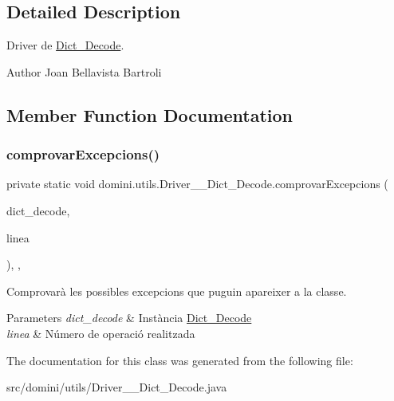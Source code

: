 \subsection{Detailed Description}
Driver de \hyperlink{classdomini_1_1utils_1_1Dict__Decode}{Dict\+\_\+\+Decode}. 

\begin{DoxyAuthor}{Author}
Joan Bellavista Bartroli 
\end{DoxyAuthor}


\subsection{Member Function Documentation}
\mbox{\label{classdomini_1_1utils_1_1Driver____Dict__Decode_a41ddfd0f1473de9401aa7860cff2f3e8}} 
\subsubsection{\texorpdfstring{comprovar\+Excepcions()}{comprovarExcepcions()}}
{\footnotesize\ttfamily private static void domini.\+utils.\+Driver\+\_\+\+\_\+\+Dict\+\_\+\+Decode.\+comprovar\+Excepcions (\begin{DoxyParamCaption}\item[{\hyperlink{classdomini_1_1utils_1_1Dict__Decode}{Dict\+\_\+\+Decode}}]{dict\+\_\+decode,  }\item[{String}]{linea }\end{DoxyParamCaption})\hspace{0.3cm}{\ttfamily [inline]}, {\ttfamily [static]}, {\ttfamily [private]}}



Comprovarà les possibles excepcions que puguin apareixer a la classe. 


\begin{DoxyParams}{Parameters}
{\em dict\+\_\+decode} & Instància \hyperlink{classdomini_1_1utils_1_1Dict__Decode}{Dict\+\_\+\+Decode} \\
\hline
{\em linea} & Número de operació realitzada \\
\hline
\end{DoxyParams}


The documentation for this class was generated from the following file\+:\begin{DoxyCompactItemize}
\item 
src/domini/utils/Driver\+\_\+\+\_\+\+Dict\+\_\+\+Decode.\+java\end{DoxyCompactItemize}
